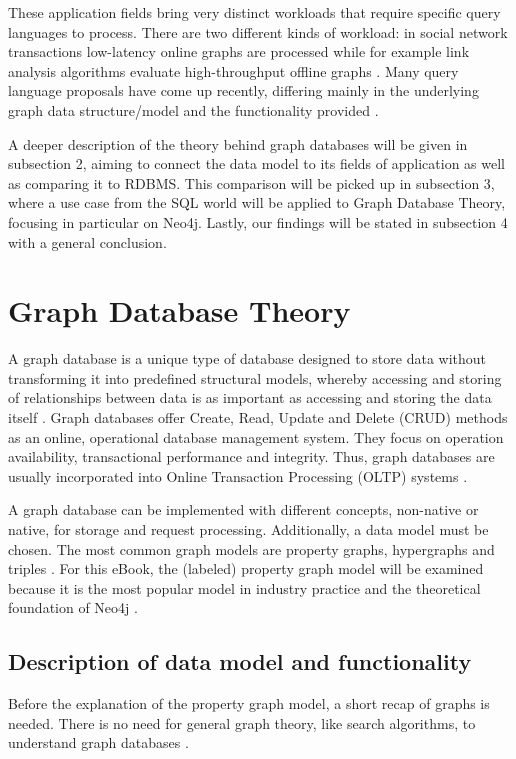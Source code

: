 These application fields bring very distinct workloads that require specific query languages to process. There are two different kinds of workload: in social network transactions low-latency online graphs are processed while for example link analysis algorithms evaluate high-throughput offline graphs \autocite{Angles2018AnIT}. Many query language proposals have come up recently, differing mainly in the underlying graph data structure/model and the functionality provided \autocite{Wood2012QueryLF}.

A deeper description of the theory behind graph databases will be given in subsection 2, aiming to connect the data model to its fields of application as well as comparing it to RDBMS. This comparison will be picked up in subsection 3, where a use case from the SQL world will be applied to Graph Database Theory, focusing in particular on Neo4j. Lastly, our findings will be stated in subsection 4 with a general conclusion.



\section{Graph Database Theory}
A graph database is a unique type of database designed to store data without transforming it into predefined structural models, whereby accessing and storing of relationships between data is as important as accessing and storing the data itself \autocite{neo4j:graphdb}. Graph databases offer Create, Read, Update and Delete (CRUD) methods as an online, operational database management system. They focus on operation availability, transactional performance and integrity. Thus, graph databases are usually incorporated into Online Transaction Processing (OLTP) systems \autocite{graphdb2015}.

A graph database can be implemented with different concepts, non-native or native, for storage and request processing. Additionally, a data model must be chosen. The most common graph models are property graphs, hypergraphs and triples \autocite{graphdb2015}. For this eBook, the (labeled) property graph model will be examined because it is the most popular model in industry practice \autocite{graphdb2015} and the theoretical foundation of Neo4j \autocite{maheshlal2015}.


\subsection{Description of data model and functionality}
Before the explanation of the property graph model, a short recap of graphs is needed. There is no need for general graph theory, like search algorithms, to understand graph databases \autocite{graphdb2015}.

